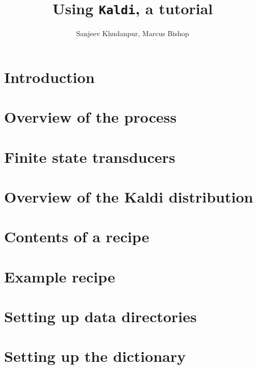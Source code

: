\documentclass[12pt]{article}
\title{Using \texttt{Kaldi}, a tutorial}
\author{Sanjeev Khudanpur, Marcus Bishop}
\begin{document}
\maketitle

\section{Introduction}

\section{Overview of the process}

\section{Finite state transducers}

\section{Overview of the \textsf{Kaldi} distribution}

\section{Contents of a recipe}

\section{Example recipe}


\section{Setting up data directories}

\section{Setting up the dictionary}




\end{document}
